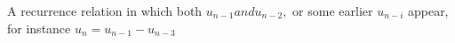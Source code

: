 A recurrence relation in which both $u_{n-1} and u_{n-2},$  or some 
earlier $u_{n-i}$  appear, for instance $u_{n} = u_{n-1} - u_{n-3}$ 